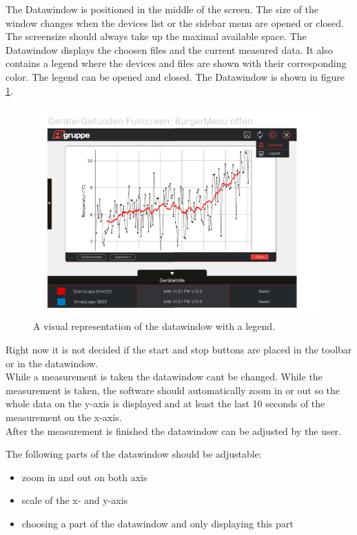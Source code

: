 \documentclass{scrreprt}
\begin{document}
The Datawindow is positioned in the middle of the screen. The size of the window changes when the devices list or the sidebar menu are opened or closed. The screensize should always take up the maximal available space. 
The Datawindow displays the choosen files and the current measured data. It also contains a legend where the devices and files are shown with their corresponding color. The legend can be opened and closed. 
The Datawindow is shown in figure \ref{fig: datawindow}.\\
\begin{figure}
    \includegraphics[width=.9\textwidth]{assets/pictures/Mainwindowopen.png}
    \caption[]{A visual representation of the datawindow with a legend.}
    \label{fig: datawindow}
\end{figure}

Right now it is not decided if the start and stop buttons are placed in the toolbar or in the datawindow. \\

While a measurement is taken the datawindow cant be changed. While the measurement is taken, the software should automatically zoom in or out so the whole data on the y-axis is displayed and at least the last 10 seconds of the measurement on the x-axis. \\

After the measurement is finished the datawindow can be adjusted by the user. 

The following parts of the datawindow should be adjustable: 

\begin{itemize}
    \item zoom in and out on both axis
    \item scale of the x- and y-axis 
    \item choosing a part of the datawindow and only displaying this part 
\end{itemize}
\end{document}
